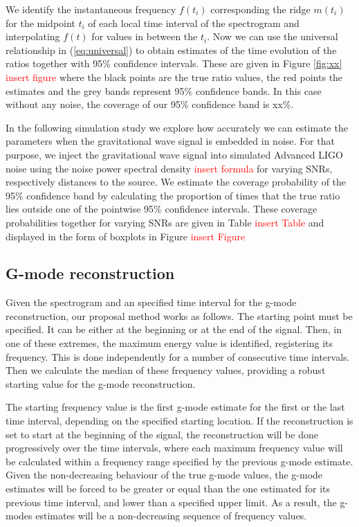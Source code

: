 {We identify the instantaneous frequency $f(t_i)$ corresponding the  ridge $m(t_i)$ for the midpoint $t_i$ of each local time interval of the spectrogram and interpolating $f(t)$
for values in between the $t_i$. Now we can use the universal relationship in (\ref{eq:universal}) to obtain estimates of the time evolution of the
ratios together with 95\% confidence intervals. These are given in Figure \ref{fig:xx} \textcolor{red}{insert figure} where the black points are the true ratio values, the red points the
estimates and the grey bands represent 95\% confidence bands. In this case without any noise, the coverage of our 95\% confidence band is xx\%.

In the following simulation study we explore how accurately we can estimate the parameters when the gravitational wave signal is embedded in noise.
For that purpose, we inject the gravitational wave signal into  simulated Advanced LIGO noise using the noise power spectral density \textcolor{red}{insert formula} for varying
SNRs, respectively distances to the source. We estimate the coverage probability of the 95\% confidence band by calculating the proportion of times that the true ratio lies outside one of the pointwise 95\% confidence intervals.
These coverage probabilities together for varying SNRs are given in Table \textcolor{red}{insert Table} and displayed in the form of boxplots in Figure \textcolor{red}{insert Figure}


\subsection{G-mode reconstruction}

Given the spectrogram and an specified time interval for the g-mode reconstruction, our proposal method works as follows.  The starting point must be specified.  It can be either at the beginning or at the end of the signal.  Then, in one of these extremes, the maximum energy value is identified, registering its frequency.  This is done independently for a number of consecutive time intervals.  Then we calculate the median of these frequency values, providing a robust starting value for the g-mode reconstruction.

The starting frequency value is the first g-mode estimate for the first or the last time interval, depending on the specified starting location.  If the reconstruction is set to start at the beginning of the signal, the reconstruction will be done progressively over the time intervals, where each maximum frequency value will be calculated within a frequency range specified by the previous g-mode estimate.  Given the non-decreasing behaviour of the true g-mode values, the g-mode estimates will be forced to be greater or equal than the one estimated for its previous time interval, and lower than a specified upper limit.  As a result, the g-modes estimates will be a non-decreasing sequence of frequency values. 

}
